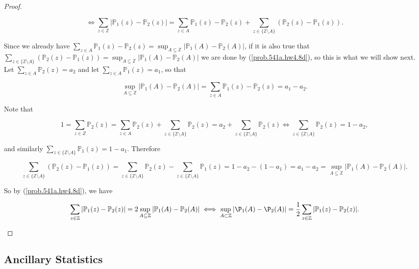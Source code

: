 \begin{proof}
\begin{enumerate}[(a)]
\begin{equation}\label{prob.541a.hw4.8d}
\iff  \sum_{z \in \mathbb{Z}}|\mathbb{P}_1(z) - \mathbb{P}_2(z)| =  \sum_{z \in A}\mathbb{P}_1(z) - \mathbb{P}_2(z) +  \sum_{z \in \{\mathbb{Z} \setminus A\}}(\mathbb{P}_{2}(z)-\mathbb{P}_{1}(z)) .
\end{equation}
 
Since we already have \(  \sum_{z \in A}\mathbb{P}_1(z) - \mathbb{P}_2(z)  = \sup_{A\subseteq\mathbb{Z}}| \mathbb{P}_{1}(A)-\mathbb{P}_{2}(A)| \), if it is also true that \( \sum_{z \in \{\mathbb{Z} \setminus A\}}(\mathbb{P}_{2}(z)-\mathbb{P}_{1}(z))  =  \sup_{A\subseteq\mathbb{Z}}| \mathbb{P}_{1}(A)-\mathbb{P}_{2}(A)| \) we are done by (\ref{prob.541a.hw4.8d}), so this is what we will show next. Let \(\sum_{z \in A} \mathbb{P}_2(z) = a_2\) and let \(\sum_{z \in A} \mathbb{P}_1(z) = a_1\), so that 

\[
\sup_{A\subseteq\mathbb{Z}}| \mathbb{P}_{1}(A)-\mathbb{P}_{2}(A)|  = \sum_{z \in A}\mathbb{P}_1(z) - \mathbb{P}_2(z) = a_1 - a_2.
\]

Note that 

\[
1 = \sum_{z \in Z} \mathbb{P}_2(z) =   \sum_{z \in A} \mathbb{P}_2(z) +  \sum_{z \in \{\mathbb{Z} \setminus A\}} \mathbb{P}_2(z)  =   a_2 +  \sum_{z \in \{\mathbb{Z} \setminus A\}} \mathbb{P}_2(z) \iff  \sum_{z \in \{\mathbb{Z} \setminus A\}} \mathbb{P}_2(z)  = 1 - a_2,
\]

and similarly \( \sum_{z \in \{\mathbb{Z} \setminus A\}} \mathbb{P}_1(z) = 1 - a_1\). Therefore

\[
 \sum_{z \in \{\mathbb{Z} \setminus A\}}(\mathbb{P}_{2}(z)-\mathbb{P}_{1}(z))  =  \sum_{z \in \{\mathbb{Z} \setminus A\}}\mathbb{P}_{2}(z) -  \sum_{z \in \{\mathbb{Z} \setminus A\}}\mathbb{P}_{1}(z)= 1 - a_2 - (1 - a_1) = a_1 - a_2 = \sup_{A\subseteq\mathbb{Z}}| \mathbb{P}_{1}(A)-\mathbb{P}_{2}(A)| .
\]

So by (\ref{prob.541a.hw4.8d}), we have

\[
\sum_{z \in \mathbb{Z}}|\mathbb{P}_1(z) - \mathbb{P}_2(z)| = 2  \sup_{A\subseteq\mathbb{Z}}| \mathbb{P}_{1}(A)-\mathbb{P}_{2}(A)| \iff  \sup_{A\subset\mathbb{Z}}|\P_{1}(A)-\P_{2}(A)|=\frac{1}{2}\sum_{z \in \mathbb{Z}}|\mathbb{P}_1(z) - \mathbb{P}_2(z)|.
\]

\end{enumerate}


\end{proof}

\subsection{Ancillary Statistics}

